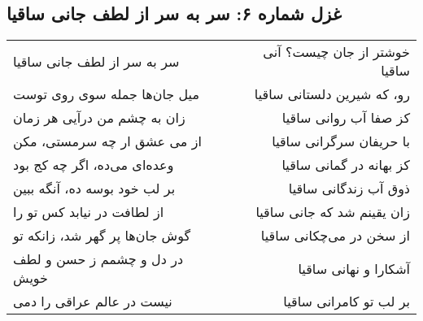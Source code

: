 \begin{center}
\section*{غزل شماره ۶: سر به سر از لطف جانی ساقیا}
\label{sec:006}
\begin{longtable}{l p{0.5cm} r}
سر به سر از لطف جانی ساقیا
&&
خوشتر از جان چیست؟ آنی ساقیا
\\
میل جان‌ها جمله سوی روی توست
&&
رو، که شیرین دلستانی ساقیا
\\
زان به چشم من درآیی هر زمان
&&
کز صفا آب روانی ساقیا
\\
از می عشق ار چه سرمستی، مکن
&&
با حریفان سرگرانی ساقیا
\\
وعده‌ای می‌ده، اگر چه کج بود
&&
کز بهانه در گمانی ساقیا
\\
بر لب خود بوسه ده، آنگه ببین
&&
ذوق آب زندگانی ساقیا
\\
از لطافت در نیابد کس تو را
&&
زان یقینم شد که جانی ساقیا
\\
گوش جان‌ها پر گهر شد، زانکه تو
&&
از سخن در می‌چکانی ساقیا
\\
در دل و چشمم ز حسن و لطف خویش
&&
آشکارا و نهانی ساقیا
\\
نیست در عالم عراقی را دمی
&&
بر لب تو کامرانی ساقیا
\\
\end{longtable}
\end{center}
